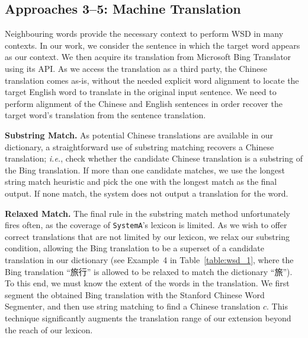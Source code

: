 \begin{CJK}{UTF8}{gbsn}
\subsection{Approaches 3--5: Machine Translation}

Neighbouring words provide the necessary context to perform WSD in
many contexts. In our work, we consider the sentence in which the
target word appears as our context. We then acquire its translation
from Microsoft Bing
Translator using its
API.  As we access the translation as a third party, the Chinese
translation comes as-is, without the needed explicit word alignment to
locate the target English word to translate in the original input
sentence. We need to perform alignment of the Chinese and English
sentences in order recover the target word's translation from the
sentence translation.

{\bf Substring Match.} As potential Chinese translations are
available in our dictionary, a straightforward use of substring
matching recovers a Chinese translation; {\it i.e.}, check whether the
candidate Chinese translation is a substring of the Bing
translation. If more than one candidate matches, we use the longest
string match heuristic and pick the one with the longest match as the
final output. If none match, the system does not output a translation
for the word.  

{\bf Relaxed Match.} The final rule in the substring match method
unfortunately fires often, as the coverage of {\tt SystemA}'s lexicon
is limited.  As we wish to offer correct translations that are not
limited by our lexicon, we relax our substring condition, allowing the
Bing translation to be a superset of a candidate translation in our
dictionary (see Example~4 in Table~\ref{table:wsd_1}, where the Bing
translation ``旅行'' is allowed to be relaxed to match the dictionary
``旅'').
To this end, we must know the extent of the words in the translation.
We first segment the obtained Bing translation with the Stanford
Chinese Word Segmenter, and then use string matching to find a Chinese
translation $c$.  This technique significantly augments the
translation range of our extension beyond the reach of our lexicon.




\end{CJK}
